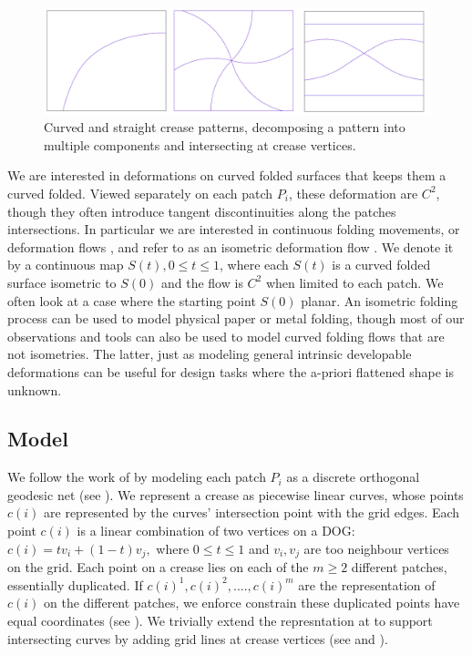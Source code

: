 \begin{figure} [h]
	\centering
	\includegraphics[width=\linewidth]{figures/crease_patterns}
	\caption{Curved and straight crease patterns, decomposing a pattern into multiple components and intersecting at crease vertices.}
	\label{fig:crease_pattern}
\end{figure}
We are interested in deformations on curved folded surfaces that keeps them a curved folded. Viewed separately on each patch $P_i$, these deformation are $C^2$, though they often introduce tangent discontinuities along the patches intersections. In particular we are interested in continuous folding movements, or deformation flows \cite{rabi2018shape}, and refer to \cite{folding} as an isometric deformation flow \cite{rabi2018shape}. We denote it by a continuous map $S(t), 0 \leq t \leq 1$, where each $S(t)$ is a curved folded surface isometric to $S(0)$ and the flow is $C^2$ when limited to each patch. We often look at a case where the starting point $S(0)$ planar. An isometric folding process can be used to model physical paper or metal folding, though most of our observations and tools can also be used to model curved folding flows that are not isometries. The latter, just as modeling general intrinsic developable deformations \cite{rabi18,rabi2018shape} can be useful for design tasks where the a-priori flattened shape is unknown.

\subsection{Model} \label{sec:model}
We follow the work of \cite{rabi2018shape} by modeling each patch $P_i$ as a discrete orthogonal geodesic net (see ). We represent a crease as piecewise linear curves, whose points $c(i)$ are represented by the curves' intersection point with the grid edges. Each point $c(i)$ is a linear combination of two vertices on a DOG: $c(i) = t v_i + (1-t)v_j,$ where $0 \leq t \leq 1$ and $v_i,v_j$ are too neighbour vertices on the grid.  Each point on a crease lies on each of the $m \geq 2$ different patches, essentially duplicated. If $c(i)^1,c(i)^2,....,c(i)^m$ are the representation of $c(i)$ on the different patches, we enforce constrain these duplicated points have equal coordinates (see ).
We trivially extend the represntation at \cite{rabi2018shape} to support intersecting curves by adding grid lines at crease vertices (see  and ).


